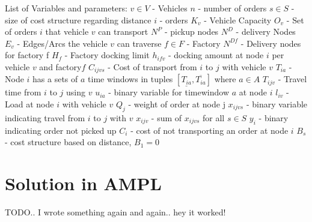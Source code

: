 \documentclass[a4paper,12pt]{article}
\begin{document}
List of Variables and parameters: \newline
$v \in V$ - Vehicles \newline
$n$ - number of orders\newline
$s \in S$ - size of cost structure regarding distance \newline
$i$ - orders\newline
$K_v$ - Vehicle Capacity \newline
$O_v$ - Set of orders $i$ that vehicle $v$ can transport \newline
$N^P$ - pickup nodes\newline
$N^D$ - delivery Nodes\newline
$E_v$ - Edges/Arcs the vehicle $v$ can traverse\newline
$f \in F$ - Factory\newline
$N^{Df}$ - Delivery nodes for factory f \newline
$H_f$ - Factory docking limit\newline
$h_{ifv}$ - docking amount at node $i$ per vehicle $v$ and factory$f$ \newline
$C_{ijvs}$ - Cost of transport from $i$ to $j$ with vehicle $v$ \newline
$T_{ia}$ - Node $i$ has a sets of $a$ time windows in tuples $[ \underline{T_{ia}},  \overline{T_{ia}} ]$ where $a \in A$ \newline
$T_{ijv}$ - Travel time from $i$ to $j$ using $v$\newline
$u_{ia}$ - binary variable for timewindow $a$ at node $i$\newline 
$l_{iv}$ - Load at node $i$ with vehicle $v$ \newline
$Q_j$ - weight of order at node j \newline
$x_{ijvs}$ - binary variable indicating travel from $i$ to $j$ with $v$ \newline
$x_{ijv}$ - sum of $x_{ijvs}$ for all $s\in S$ \newline
$y_i$ - binary indicating order not picked up \newline
$C_i$ - cost of not transporting an order at node $i$ \newline
$B_s$ - cost structure based on distance, $B_1 = 0$ \newline

\section{Solution in AMPL}
TODO.. I wrote something again and again.. hey it worked!
\end{document}

